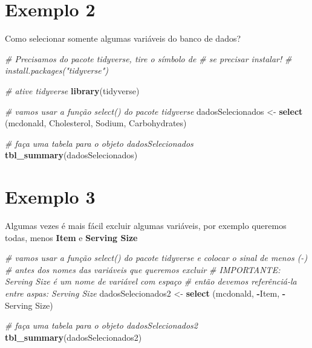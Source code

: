 \documentclass[
]{book}
\newenvironment{Shaded}{\begin{snugshade}}{\end{snugshade}}
\newcommand{\AttributeTok}[1]{\textcolor[rgb]{0.13,0.29,0.53}{#1}}
\newcommand{\CommentTok}[1]{\textcolor[rgb]{0.56,0.35,0.01}{\textit{#1}}}
\newcommand{\FunctionTok}[1]{\textcolor[rgb]{0.13,0.29,0.53}{\textbf{#1}}}
\newcommand{\NormalTok}[1]{#1}
\newcommand{\OtherTok}[1]{\textcolor[rgb]{0.56,0.35,0.01}{#1}}
\newcommand{\SpecialCharTok}[1]{\textcolor[rgb]{0.81,0.36,0.00}{\textbf{#1}}}
\newcommand{\StringTok}[1]{\textcolor[rgb]{0.31,0.60,0.02}{#1}}
\begin{document}
\section{Exemplo 2}\label{exemplo-2-2}

Como selecionar somente algumas variáveis do banco de dados?

\begin{Shaded}
\begin{Highlighting}[]
\CommentTok{\# Precisamos do pacote tidyverse, tire o símbolo de \# se precisar instalar!}
\CommentTok{\# install.packages("tidyverse")}

\CommentTok{\# ative tidyverse}
\FunctionTok{library}\NormalTok{(tidyverse)}

\CommentTok{\# vamos usar a função select() do pacote tidyverse}
\NormalTok{dadosSelecionados }\OtherTok{\textless{}{-}} \FunctionTok{select}\NormalTok{ (mcdonald, Cholesterol, Sodium, Carbohydrates)}

\CommentTok{\# faça uma tabela para o objeto dadosSelecionados}
\FunctionTok{tbl\_summary}\NormalTok{(dadosSelecionados)}
\end{Highlighting}
\end{Shaded}

\section{Exemplo 3}\label{exemplo-3-2}

Algumas vezes é mais fácil excluir algumas variáveis, por exemplo queremos todas, menos \textbf{Item} e \textbf{Serving Size}

\begin{Shaded}
\begin{Highlighting}[]
\CommentTok{\# vamos usar a função select() do pacote tidyverse e colocar o sinal de menos ({-})}
\CommentTok{\# antes dos nomes das variáveis que queremos excluir}
\CommentTok{\# IMPORTANTE: Serving Size é um nome de variável com espaço }
\CommentTok{\# então devemos referênciá{-}la entre aspas: \textasciigrave{}Serving Size\textasciigrave{}}
\NormalTok{dadosSelecionados2 }\OtherTok{\textless{}{-}} \FunctionTok{select}\NormalTok{ (mcdonald, }\SpecialCharTok{{-}}\NormalTok{Item, }\SpecialCharTok{{-}}\StringTok{\textasciigrave{}}\AttributeTok{Serving Size}\StringTok{\textasciigrave{}}\NormalTok{)}

\CommentTok{\# faça uma tabela para o objeto dadosSelecionados2}
\FunctionTok{tbl\_summary}\NormalTok{(dadosSelecionados2)}
\end{Highlighting}
\end{Shaded}
\end{document}
